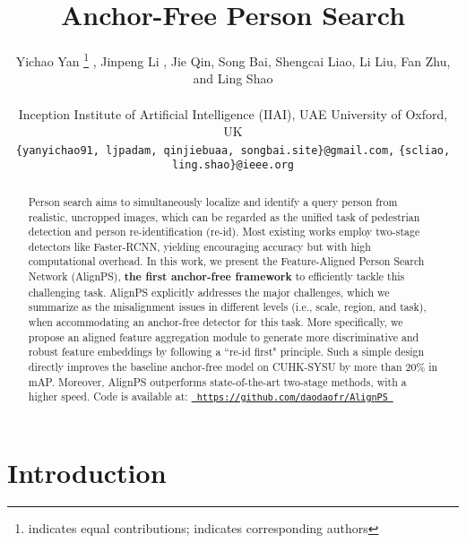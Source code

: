 \documentclass[final]{cvpr}
\begin{document}
\title{Anchor-Free Person Search}

\author{Yichao Yan \thanks{indicates equal contributions; indicates corresponding authors}  ,
Jinpeng Li ,
Jie Qin,
Song Bai,
Shengcai Liao,
Li Liu,
Fan Zhu,
and Ling Shao
\\
\noindent

Inception Institute of Artificial Intelligence (IIAI), UAE \qquad  University of Oxford, UK \qquad \\


 {\tt\small \{yanyichao91, ljpadam, qinjiebuaa, songbai.site\}@gmail.com,} \tt\small \{scliao, ling.shao\}@ieee.org\\
}

\maketitle


\begin{abstract}


   Person search aims to simultaneously localize and identify a query person from realistic, uncropped images, which can be regarded as the unified task of pedestrian detection and person re-identification (re-id). Most existing works employ two-stage detectors like Faster-RCNN, yielding encouraging accuracy but with high computational overhead. In this work, we present the Feature-Aligned Person Search Network (AlignPS), \textbf{the first anchor-free framework} to efficiently tackle this challenging task. AlignPS explicitly addresses the major challenges, which we summarize as the misalignment issues in different levels (i.e., scale, region, and task), when accommodating an anchor-free detector for this task.
More specifically, we propose an aligned feature aggregation module to generate more discriminative and robust feature embeddings by following a ``re-id first" principle. Such a simple design directly improves the baseline anchor-free model on CUHK-SYSU by more than 20\% in mAP. Moreover, AlignPS outperforms state-of-the-art two-stage methods, with a higher speed. Code is available at: {\tt\small \url{ https://github.com/daodaofr/AlignPS }}

   
\end{abstract}

\section{Introduction}
\end{document}
